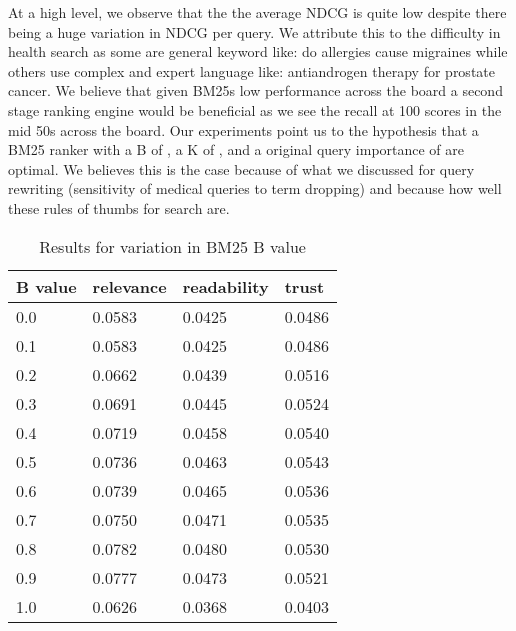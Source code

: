 \documentclass[11pt]{article}
\begin{document}
At a high level, we observe that the the average NDCG is quite low despite there being a huge variation in NDCG per query. We attribute this to the difficulty in health search as some are general keyword like: do allergies cause migraines while others use complex and expert language like: antiandrogen therapy for prostate cancer. We believe that given BM25s low performance across the board a second stage ranking engine would be beneficial as we see the recall at 100 scores in the mid 50s across the board. Our experiments point us to the hypothesis that a BM25 ranker with a B of {}, a K of {}, and a original query importance of {} are optimal. We believes this is the case because of what we discussed for query rewriting (sensitivity of medical queries to term dropping) and because how well these rules of thumbs for search are. 
\begin{table}[]
\begin{tabular}{|l|l|l|l|} \hline
B value & relevance & readability & trust  \\ \hline
0.0     & 0.0583    & 0.0425      & 0.0486 \\ \hline
0.1     & 0.0583    & 0.0425      & 0.0486 \\ \hline
0.2     & 0.0662    & 0.0439      & 0.0516 \\ \hline
0.3     & 0.0691    & 0.0445      & 0.0524 \\ \hline
0.4     & 0.0719    & 0.0458      & 0.0540 \\ \hline
0.5     & 0.0736    & 0.0463      & 0.0543 \\ \hline
0.6     & 0.0739    & 0.0465      & 0.0536 \\ \hline
0.7     & 0.0750    & 0.0471      & 0.0535 \\ \hline
0.8     & 0.0782    & 0.0480      & 0.0530 \\ \hline
0.9     & 0.0777    & 0.0473      & 0.0521 \\ \hline
1.0     & 0.0626    & 0.0368      & 0.0403 \\ \hline
\end{tabular}
\caption{Results for variation in BM25 B value}
\label{tab:vary-b}
\end{table}
\end{document}
